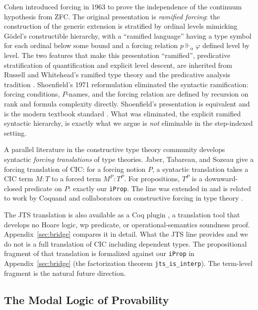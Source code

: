 Cohen introduced forcing in 1963
\cite{cohen1963-independence-i,cohen1963-independence-ii,cohen1966}
to prove the independence of the continuum hypothesis from
\textsf{ZFC}.  The original presentation is \emph{ramified forcing}:
the construction of the generic extension is stratified by ordinal
levels mimicking Gödel's constructible hierarchy, with a
``ramified language'' having a type symbol for each ordinal below
some bound and a forcing relation $p \Vdash_\alpha \varphi$ defined
level by level.  The two features that make this presentation
``ramified'', predicative stratification of quantification and
explicit level descent, are inherited from Russell and Whitehead's
ramified type theory \cite{russell-whitehead-PM} and the predicative
analysis tradition \cite{weyl1918,feferman1998}.  Shoenfield's 1971
reformulation \cite{shoenfield1971} eliminated the syntactic
ramification: forcing conditions, $P$-names, and the forcing
relation are defined by recursion on rank and formula complexity
directly.  Shoenfield's presentation is equivalent and is the
modern textbook standard
\cite{kunen2011,jech2003,scott-solovay1967}.  What was eliminated,
the explicit ramified syntactic hierarchy, is exactly what we
argue is \emph{not} eliminable in the step-indexed setting.

A parallel literature in the constructive type theory community
develops syntactic \emph{forcing translations} of type theories.
Jaber, Tabareau, and Sozeau \citeyearpar{jaber-tabareau-sozeau-2012} give a
forcing translation of CIC: for a forcing notion $P$, a syntactic
translation takes a CIC term $M : T$ to a forced term $M^P : T^P$.
For propositions, $T^P$ is a downward-closed predicate on $P$:
exactly our \texttt{iProp}.  The line was extended in
\cite{jaber-et-al-2016} and is related to work by Coquand and
collaborators on constructive forcing in type theory
\cite{coquand-jaber2010}.

The JTS translation is also available as a Coq plugin
\cite{forcing-coq-plugin}, a translation tool that develops no Hoare
logic, wp predicate, or operational-semantics soundness proof.
Appendix~\ref{sec:bridge} compares it in detail.  What the JTS line
provides and we do not is a full translation of CIC including
dependent types.  The propositional fragment of that translation is
formalized against our \texttt{iProp} in Appendix~\ref{sec:bridge}
(the factorization theorem \texttt{jts\_is\_interp}).  The term-level
fragment is the natural future direction.

\subsection{The Modal Logic of Provability}

